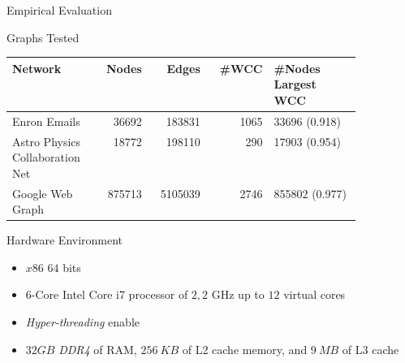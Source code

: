 \begin{frame}[fragile]{Empirical Evaluation}
  \begin{block}{Graphs Tested}
  \begin{table}[H]
    \centering
    \begin{tabular}{|p{0.25\linewidth}|r|r|r|p{0.25\linewidth}|}
     \hline
     \textbf{Network} & \textbf{Nodes} & \textbf{Edges} & \textbf{\#WCC} & \textbf{\#Nodes Largest WCC} \\
     \hline
     Enron Emails & 36692 & 183831 & 1065 & 33696 (0.918) \\
     \hline
     Astro Physics Collaboration Net & 18772 & 198110 & 290 & 17903 (0.954)\\
     \hline
     Google Web Graph & 875713 & 5105039 & 2746 & 855802 (0.977)\\
     \hline
    \end{tabular}
   \end{table}
  \end{block}
  \begin{block}{Hardware Environment}
    \begin{itemize}
          \item $x86$ $64$ bits
          \item $6$-Core Intel Core i7 processor of $2,2$ GHz up to $12$ virtual cores
          \item \emph{Hyper-threading} enable
          \item $32 GB$ \emph{DDR4} of RAM, $256\ KB$ of L2 cache memory, and $9\ MB$ of L3 cache
      \end{itemize}        
  \end{block}
\end{frame}

